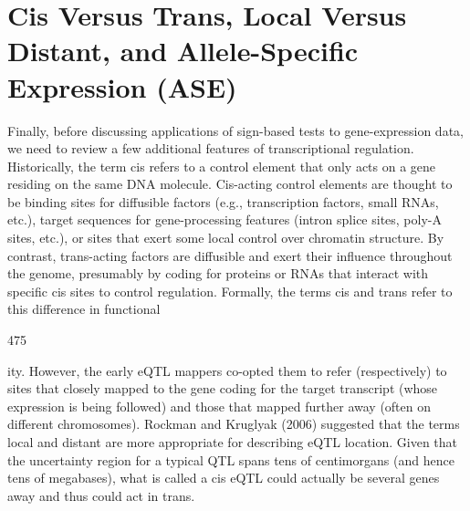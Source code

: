 \documentclass{article}
\begin{document}
\section{Cis Versus Trans, Local Versus Distant, and Allele-Specific Expression (ASE)}
Finally, before discussing applications of sign-based tests to gene-expression data, we need to review a few additional features of transcriptional regulation. Historically, the term cis refers to a control element that only acts on a gene residing on the same DNA molecule. Cis-acting control elements are thought to be binding sites for diffusible factors (e.g., transcription factors, small RNAs, etc.), target sequences for gene-processing features (intron splice sites, poly-A sites, etc.), or sites that exert some local control over chromatin structure. By contrast, trans-acting factors are diffusible and exert their influence throughout the genome, presumably by coding for proteins or RNAs that interact with specific cis sites to control regulation. Formally, the terms cis and trans refer to this difference in functional

475

ity. However, the early eQTL mappers co-opted them to refer (respectively) to sites that closely mapped to the gene coding for the target transcript (whose expression is being followed) and those that mapped further away (often on different chromosomes). Rockman and Kruglyak (2006) suggested that the terms local and distant are more appropriate for describing eQTL location. Given that the uncertainty region for a typical QTL spans tens of centimorgans (and hence tens of megabases), what is called a cis eQTL could actually be several genes away and thus could act in trans.
\end{document}
